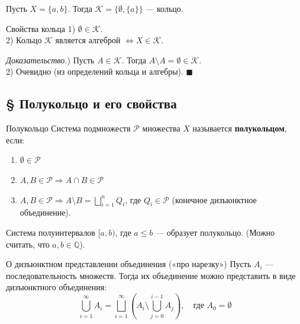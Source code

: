 \documentclass[12pt,a4paper]{article}
\newenvironment{Proof}[1][Доказательство]{\vspace{0.5em}\noindent\textit{#1.}\hspace{0.5em}\ignorespaces}{\hfill$\blacksquare$\vspace{1em}}
\begin{document}
\begin{Example}
Пусть $X = \{a, b\}$. Тогда $\mathcal{K} = \{\emptyset, \{a\}\}$ — кольцо.
\end{Example}

\begin{Lemma}{Свойства кольца}{}
1) $\emptyset \in \mathcal{K}$. \\
2) Кольцо $\mathcal{K}$ является алгеброй $\Leftrightarrow X \in \mathcal{K}$.
\end{Lemma}

\begin{Proof}
1) Пусть $A \in \mathcal{K}$. Тогда $A \setminus A = \emptyset \in \mathcal{K}$. \\
2) Очевидно (из определений кольца и алгебры).
\end{Proof}

\subsection{§ Полукольцо и его свойства}

\begin{Definition}{Полукольцо}{}
Система подмножеств $\mathcal{P}$ множества $X$ называется \textbf{полукольцом}, если:
\begin{enumerate}
    \item $\emptyset \in \mathcal{P}$
    \item $A, B \in \mathcal{P} \Rightarrow A \cap B \in \mathcal{P}$
    \item $A, B \in \mathcal{P} \Rightarrow A \setminus B = \bigsqcup\limits_{i=1}^n Q_i$, где $Q_i \in \mathcal{P}$ (конечное дизъюнктное объединение).
\end{enumerate}
\end{Definition}

\begin{Example}
Система полуинтервалов $[a, b)$, где $a \le b$ — образует полукольцо. (Можно считать, что $a, b \in \mathbb{Q}$).
\end{Example}

\begin{Lemma}{О дизъюнктном представлении объединения («про нарезку»)}{}
Пусть $A_i$ — последовательность множеств. Тогда их объединение можно представить в виде дизъюнктного объединения:
$$ \bigcup_{i=1}^{\infty} A_i = \bigsqcup_{i=1}^{\infty} \left( A_i \setminus \bigcup_{j=0}^{i-1} A_j \right), \quad \text{где } A_0 = \emptyset $$
\end{Lemma}
\end{document}
